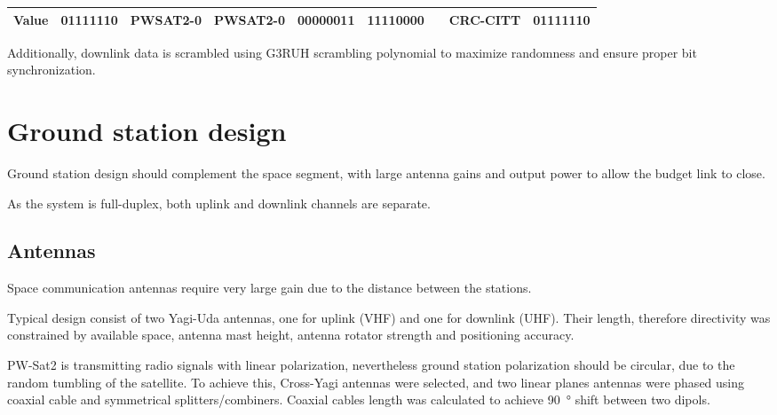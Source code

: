\begin{table}
\begin{tabular}{l|c|c|c|c|c|c|c|c|}
\hline
\multicolumn{1}{|c|}{Value}                                                    & 01111110               & PWSAT2-0                                                     & PWSAT2-0                                                & 00000011                                              & 11110000                                                     & {\cellcolor[rgb]{0.753,0.753,0.753}}                                                                                                                  & CRC-CITT                                                                         & 01111110               \\
\hline
\end{tabular}
\end{table}


Additionally, downlink data is scrambled using G3RUH scrambling polynomial to maximize randomness and ensure proper bit synchronization.


\chapter{Ground station design}
Ground station design should complement the space segment, with large antenna gains and output power to allow the budget link to close.

As the system is full-duplex, both uplink and downlink channels are separate.

\section{Antennas}
Space communication antennas require very large gain due to the distance between the stations. 

Typical design consist of two Yagi-Uda antennas, one for uplink (VHF) and one for downlink (UHF). Their length, therefore directivity was constrained by available space, antenna mast height, antenna rotator strength and positioning accuracy.

PW-Sat2 is transmitting radio signals with linear polarization, nevertheless ground station  polarization should be circular, due to the random tumbling of the satellite. To achieve this, Cross-Yagi antennas were selected, and two linear planes antennas were phased using coaxial cable and symmetrical splitters/combiners. Coaxial cables length was calculated to achieve \SI{90}{\degree} shift between two dipols.

